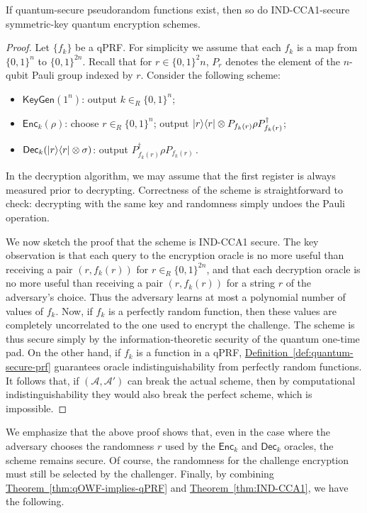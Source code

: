 \documentclass[envcountsame]{llncs}
\numberwithin{equation}{section}
\newcommand{\expref}[2]{\texorpdfstring{\hyperref[#2]{#1~\ref{#2}}}{#1~\ref{#2}}}
\newcommand{\algo}{\mathcal}
\newcommand{\KeyGen}{\ensuremath{\mathsf{KeyGen}}\xspace}
\newcommand{\Enc}{\ensuremath{\mathsf{Enc}}\xspace}
\newcommand{\Dec}{\ensuremath{\mathsf{Dec}}\xspace}
\newcommand{\inrand}{\in_R}
\begin{document}
\begin{theorem}\label{thm:IND-CCA1}
If quantum-secure pseudorandom functions exist, then so do IND-CCA1-secure symmetric-key quantum encryption schemes.
\end{theorem}
\begin{proof}
Let $\{f_k\}$ be a qPRF. For simplicity we assume that each $f_k$ is a map from $\{0, 1\}^n$ to $\{0, 1\}^{2n}$. Recall that for $r \in \{0, 1\}^2n$, $P_r$ denotes the element of the $n$-qubit Pauli group indexed by $r$. Consider the following scheme:
\begin{itemize}
\item $\KeyGen(1^n)$: output $k \inrand \{0, 1\}^n$;
\item $\Enc_k(\rho)$: choose $r \inrand \{0, 1\}^n$; output ${\left\vert{r}\right\rangle}{\left\langle{r}\right\vert} \otimes P_{f_k(r)} \rho P_{f_k(r)}^{\dagger}$;
\item $\Dec_k(\ket{r}\bra{r} \otimes \sigma)$: output  $P_{f_k(r)}^\dagger \rho P_{f_k(r)}$\,.
\end{itemize}
In the decryption algorithm, we may assume that the first register is always measured prior to decrypting. Correctness of the scheme is straightforward to check: decrypting with the same key and randomness simply undoes the Pauli operation.

We now sketch the proof that the scheme is IND-CCA1 secure. The key observation is that each query to the encryption oracle is no more useful than receiving a pair $(r, f_k(r))$ for $r \inrand \{0, 1\}^{2n}$, and that each decryption oracle is no more useful than receiving a pair $(r, f_k(r))$ for a string $r$ of the adversary's choice. Thus the adversary learns at most a polynomial number of values of $f_k$. Now, if $f_k$ is a perfectly random function, then these values are completely uncorrelated to the one used to encrypt the challenge. The scheme is thus secure simply by the information-theoretic security of the quantum one-time pad. On the other hand, if $f_k$ is a function in a qPRF, \expref{Definition}{def:quantum-secure-prf} guarantees oracle indistinguishability from perfectly random functions. It follows that, if $(\algo A, \algo A')$ can break the actual scheme, then by computational indistinguishability they would also break the perfect scheme, which is impossible.
\end{proof}

We emphasize that the above proof shows that, even in the case where the adversary chooses the randomness $r$ used by the $\Enc_k$ and $\Dec_k$ oracles, the scheme remains secure. Of course, the randomness for the challenge encryption must still be selected by the challenger. Finally, by combining \expref{Theorem}{thm:qOWF-implies-qPRF} and \expref{Theorem}{thm:IND-CCA1}, we have the following.
\end{document}
